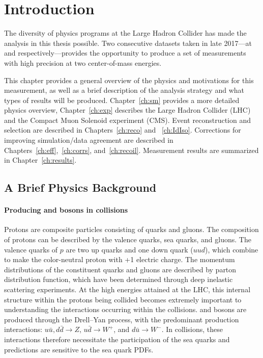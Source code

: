 \chapter{Introduction}

The diversity of physics programs at the Large Hadron Collider has made the analysis in this thesis possible. Two consecutive datasets taken in late 2017---at \serag and \serah respectively---provides the opportunity to produce a set of measurements with high precision at two center-of-mass energies. 

This chapter provides a general overview of the physics and motivations for this measurement, as well as a brief description of the analysis strategy and what types of results will be produced. Chapter~\ref{ch:sm} provides a more detailed physics overview, Chapter~\ref{ch:exp} describes the Large Hadron Collider (LHC) and the Compact Muon Solenoid experiment (CMS). Event reconstruction and selection are described in Chapters~\ref{ch:reco} and ~\ref{ch:IdIso}. Corrections for improving simulation/data agreement are described in Chapters~\ref{ch:eff},~\ref{ch:corrs}, and~\ref{ch:recoil}. Measurement results are summarized in Chapter~\ref{ch:results}. 


\section{A Brief Physics Background}

\subsubsection{Producing \W and \Z bosons in \pp collisions}
Protons are composite particles consisting of quarks and gluons. The composition of protons can be described by the valence quarks, sea quarks, and gluons. The valence quarks of $p$ are two up quarks and one down quark ($uud$), which combine to make the color-neutral proton with +1 electric charge. The momentum distributions of the constituent quarks and gluons are described by parton distribution function, which have been determined through deep inelastic scattering experiments. At the high energies attained at the LHC, this internal structure within the protons being collided becomes extremely important to understanding the interactions occurring within the \pp collisions. \W and \Z bosons are produced through the Drell--Yan process, with the predominant production interactions: $u\bar{u}, d\bar{d}\rightarrow Z$,  $u\bar{d}\rightarrow W^+$,  and $d\bar{u}\rightarrow W^-$. In \pp collisions, these interactions therefore necessitate the participation of the sea quarks and predictions are sensitive to the sea quark PDFs.

